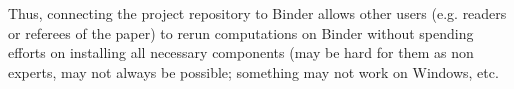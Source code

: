 \documentclass{deliverablereport}
\begin{document}
Thus, connecting the project repository to Binder allows other users
(e.g. readers or referees of the paper) to rerun computations on Binder
without spending efforts on installing all necessary components
(may be hard for them as non experts, may not always be possible;
something may not work on Windows, etc.


\clearpage
{}
\printbibliography
\end{document}
